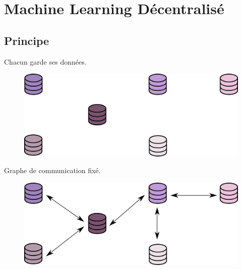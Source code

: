 \documentclass[notheorems]{beamer}
\begin{document}
\section{Machine Learning Décentralisé}
\subsection{Principe}
\begin{frame}
  Chacun garde ses données.
  \vspace{1em}
  \begin{figure}
    \includegraphics[width=1\linewidth]{images/mixed_db.pdf}
  \end{figure}
\end{frame}

\begin{frame}
  Graphe de communication fixé.
  \vspace{1em}
  \begin{figure}
    \includegraphics[width=1\linewidth]{images/graph_learn.pdf}
  \end{figure}
\end{frame}
\end{document}
